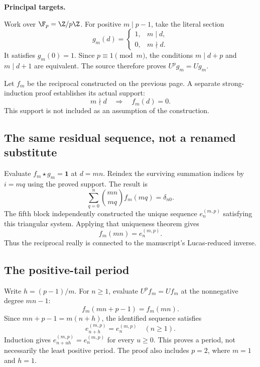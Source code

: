 \textbf{Principal targets.}\par
{}\par
{}\par
{}\par
{}

\par\medskip
{}
Work over $\F_p=\Z/p\Z$. For positive $m\mid p-1$, take the literal section
\[
 g_m(d)=\begin{cases}1,&m\mid d,\\0,&m\nmid d.\end{cases}
\]
It satisfies $g_m(0)=1$. Since $p\equiv1\pmod m$, the conditions $m\mid d+p$ and $m\mid d+1$ are equivalent. The source therefore proves $U^pg_m=Ug_m$.

Let $f_m$ be the reciprocal constructed on the previous page. A separate strong-induction proof establishes its actual support:
\[
 m\nmid d\quad\Longrightarrow\quad f_m(d)=0.
\]
This support is not included as an assumption of the construction.

\subsection*{The same residual sequence, not a renamed substitute}
Evaluate $f_m\star g_m=\mathbf1$ at $d=mn$. Reindex the surviving summation indices by $i=mq$ using the proved support. The result is
\[
 \sum_{q=0}^{n}\binom{mn}{mq}f_m(mq)=\delta_{n0}.
\]
The fifth block independently constructed the unique sequence $e_n^{(m,p)}$ satisfying this triangular system. Applying that uniqueness theorem gives
\[
 \boxed{f_m(mn)=e_n^{(m,p)}.}
\]
Thus the reciprocal really is connected to the manuscript's Lucas-reduced inverse.

\subsection*{The positive-tail period}
Write $h=(p-1)/m$. For $n\ge1$, evaluate $U^pf_m=Uf_m$ at the nonnegative degree $mn-1$:
\[
 f_m(mn+p-1)=f_m(mn).
\]
Since $mn+p-1=m(n+h)$, the identified sequence satisfies
\[
 \boxed{e_{n+h}^{(m,p)}=e_n^{(m,p)}\quad(n\ge1).}
\]
Induction gives $e_{n+uh}^{(m,p)}=e_n^{(m,p)}$ for every $u\ge0$. This proves a period, not necessarily the least positive period. The proof also includes $p=2$, where $m=1$ and $h=1$.

